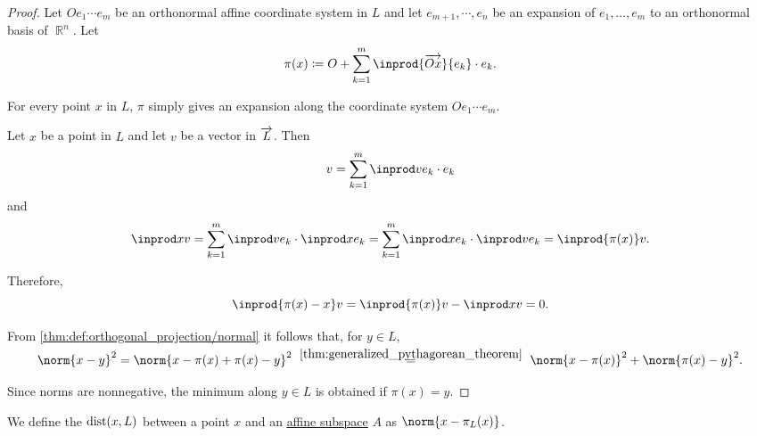 \begin{proof}
  Let \( O e_1 \cdots e_m \) be an orthonormal affine coordinate system in \( L \) and let \( e_{m+1}, \cdots, e_n \) be an expansion of \( e_1, \ldots, e_m \) to an orthonormal basis of \( \BbbR^n \). Let
  \begin{equation*}
    \pi(x) \coloneqq O + \sum_{k=1}^m \inprod {\vect{Ox}} {e_k} \cdot e_k.
  \end{equation*}

   For every point \( x \) in \( L \), \( \pi \) simply gives an expansion along the coordinate system \( O e_1 \cdots e_m \).

   Let \( x \) be a point in \( L \) and let \( v \) be a vector in \( \overrightarrow{L} \). Then
  \begin{equation*}
    v = \sum_{k=1}^m \inprod v {e_k} \cdot e_k
  \end{equation*}
  and
  \begin{equation*}
    \inprod x v
    =
    \sum_{k=1}^m \inprod v {e_k} \cdot \inprod x {e_k}
    =
    \sum_{k=1}^m \inprod x {e_k} \cdot \inprod v {e_k}
    =
    \inprod {\pi(x)} v.
  \end{equation*}

  Therefore,
  \begin{equation*}
    \inprod {\pi(x) - x} v
    =
    \inprod {\pi(x)} v - \inprod x v
    =
    0.
  \end{equation*}

   From \cref{thm:def:orthogonal_projection/normal} it follows that, for \( y \in L \),
  \begin{equation*}
    \norm{ x - y }^2
    =
    \norm{ x - \pi(x) + \pi(x) - y }^2
    \reloset {\ref{thm:generalized_pythagorean_theorem}} =
    \norm{ x - \pi(x) }^2 + \norm{ \pi(x) - y }^2.
  \end{equation*}

  Since norms are nonnegative, the minimum along \( y \in L \) is obtained if \( \pi(x) = y \).
\end{proof}

\begin{definition}\label{def:distance_to_subspace}
  We define the  \( \op{dist}(x, L) \) between a point \( x \) and an \hyperref[def:affine_subspace]{affine subspace} \( A \) as \( \norm{ x - \pi_L(x) } \).
\end{definition}

